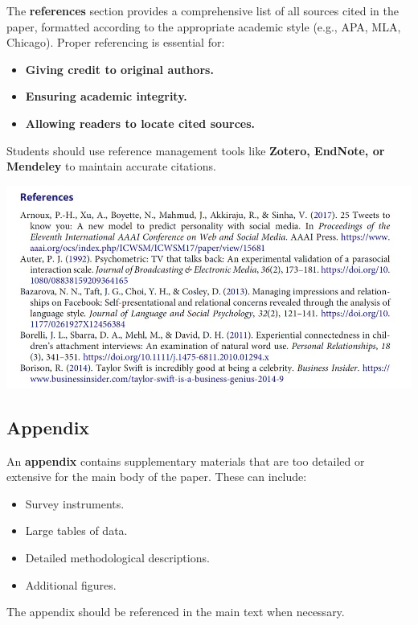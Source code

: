 \documentclass[
]{book}
\providecommand{\tightlist}{%
  \setlength{\itemsep}{0pt}\setlength{\parskip}{0pt}}
\begin{document}
The \textbf{references} section provides a comprehensive list of all sources cited in the paper, formatted according to the appropriate academic style (e.g., APA, MLA, Chicago). Proper referencing is essential for:

\begin{itemize}
\tightlist
\item
  \textbf{Giving credit to original authors.}
\item
  \textbf{Ensuring academic integrity.}
\item
  \textbf{Allowing readers to locate cited sources.}
\end{itemize}

Students should use reference management tools like \textbf{Zotero, EndNote, or Mendeley} to maintain accurate citations.

\includegraphics[width=1\linewidth,height=\textheight,keepaspectratio]{images/fig085.jpg}

\subsection*{Appendix}\label{appendix}

An \textbf{appendix} contains supplementary materials that are too detailed or extensive for the main body of the paper. These can include:

\begin{itemize}
\tightlist
\item
  Survey instruments.
\item
  Large tables of data.
\item
  Detailed methodological descriptions.
\item
  Additional figures.
\end{itemize}

The appendix should be referenced in the main text when necessary.
\end{document}
